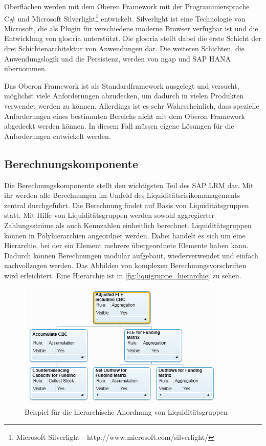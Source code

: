 \begin{onehalfspacing}
Oberflächen werden mit dem Oberen Framework mit der Programmiersprache C\# und Microsoft Silverlight\footnote{Microsoft Silverlight - http://www.microsoft.com/silverlight/} entwickelt. Silverlight ist eine Technologie von Microsoft, die als Plugin für verschiedene moderne Browser verfügbar ist und die Entwicklung von \gls{glos:ria} unterstützt. Die \gls{glos:ria} stellt dabei die erste Schicht der drei Schichtenarchitektur von Anwendungen dar. Die weiteren Schichten, die Anwendungslogik und die Persistenz, werden von \gls{ngap} und SAP HANA übernommen.

Das Oberon Framework ist als Standardframework ausgelegt und versucht, möglichst viele Anforderungen abzudecken, um dadurch in vielen Produkten verwendet werden zu können. Allerdings ist es sehr Wahrscheinlich, dass spezielle Anforderungen eines bestimmten Bereichs nicht mit dem Oberon Framework abgedeckt werden können. In diesem Fall müssen eigene Lösungen für die Anforderungen entwickelt werden.

\subsection{Berechnungskomponente}
\label{sec:berechnungskomponente}
Die Berechnungskomponente stellt den wichtigsten Teil des SAP LRM dar. Mit ihr werden alle Berechnungen im Umfeld des Liquiditätsrisikomanagements zentral durchgeführt. Die Berechnung findet auf Basis von Liquiditätsgruppen statt. Mit Hilfe von Liquiditätsgruppen werden sowohl aggregierter Zahlungsströme als auch Kennzahlen einheitlich berechnet. Liquiditätsgruppen können in Polyhierarchien angeordnet werden. Dabei handelt es sich um eine Hierarchie, bei der ein Element mehrere übergeordnete Elemente haben kann. Dadurch können Berechnungen modular aufgebaut, wiederverwendet und einfach nachvollzogen werden. Das Abbilden von komplexen Berechnungsvorschriften wird erleichtert. Eine Hierarchie ist in \vref{fig:liquigruppe_hierarchie} zu sehen.

\begin{figure}[!ht]
\centering
\setlength{\unitlength}{1mm}
\includegraphics[width=10cm]{images/liquigruppe_hierarchie.PNG}
\caption{
Beispiel für die hierarchische Anordnung von Liquiditätsgruppen
\label{fig:liquigruppe_hierarchie}}
\end{figure}


\end{onehalfspacing}
